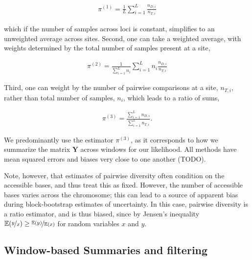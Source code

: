 \documentclass[11pt]{article}
\newcommand{\E}{\mathbb{E}}
\begin{document}
\begin{align}
  \label{eq:}
  \pi^{(1)} = \frac{1}{L} \sum_{i=1}^L \frac{n_{D,i}}{n_{T,i}}
\end{align}

which if the number of samples across loci is constant, simplifies to an
unweighted average across sites. Second, one can take a weighted average, with
weights determined by the total number of samples present at a site,

\begin{align}
  \label{eq:}
  \pi^{(2)} = \frac{1}{\sum_{i=1}^L n_i} \sum_{i=1}^L n_i \frac{n_{D,i}}{n_{T,i}}
\end{align}

Third, one can weight by the number of pairwise comparisons at a site,
$n_{T,i}$, rather than total number of samples, $n_i$, which leads to a ratio
of sums,

\begin{align}
  \label{eq:}
  \pi^{(3)} = \frac{\sum_{i=1}^L n_{D,i}}{\sum_{i=1}^L n_{T,i}}.
\end{align}

We predominantly use the estimator $\pi^{(3)}$, as it corresponds to how we
summarize the matrix $\mathbf{Y}$ across windows for our likelihood. All
methods have mean squared errors and biases very close to one another (TODO).

Note, however, that estimates of pairwise diversity often condition on the
accessible bases, and thus treat this as fixed. However, the number of
accessible bases varies across the chromosome; this can lead to a source of
apparent bias during block-bootstrap estimates of uncertainty.  In this case,
pairwise diversity is a ratio estimator, and is thus biased, since by Jensen's
inequality $\E(\nicefrac{y}{x}) \ge \nicefrac{\E(y)}{\E(x)}$ for random
variables $x$ and $y$. 

\subsection{Window-based Summaries and filtering}
\end{document}
